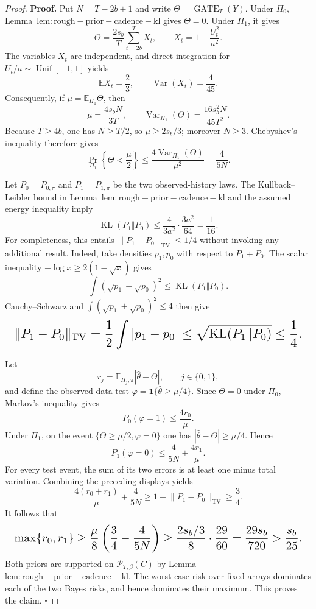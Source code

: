 \documentclass{article}
\begin{document}
\begin{proof}
\textbf{Proof.} Put \(N=T-2b+1\) and write \(\Theta=\operatorname{GATE}_T(Y)\). Under \(\Pi_0\), Lemma~\(\mathrm{lem:rough-prior-cadence-kl}\) gives \(\Theta=0\). Under \(\Pi_1\), it gives
\[
\Theta=\frac{2s_b}{T}\sum_{t=2b}^T X_t,
\qquad
X_t=1-\frac{U_t^2}{a^2}.
\]
The variables \(X_t\) are independent, and direct integration for \(U_t/a\sim\operatorname{Unif}[-1,1]\) yields
\[
\mathbb E X_t=\frac23,
\qquad
\operatorname{Var}(X_t)=\frac4{45}.
\]
Consequently, if \(\mu=\mathbb E_{\Pi_1}\Theta\), then
\[
\mu=\frac{4s_bN}{3T},
\qquad
\operatorname{Var}_{\Pi_1}(\Theta)=\frac{16s_b^2N}{45T^2}.
\]
Because \(T\ge4b\), one has \(N\ge T/2\), so \(\mu\ge2s_b/3\); moreover \(N\ge3\). Chebyshev's inequality therefore gives
\[
\Pr_{\Pi_1}\left\{\Theta<\frac\mu2\right\}
\le \frac{4\operatorname{Var}_{\Pi_1}(\Theta)}{\mu^2}
=\frac4{5N}.
\]

Let \(P_0=P_{0,\pi}\) and \(P_1=P_{1,\pi}\) be the two observed-history laws. The Kullback--Leibler bound in Lemma~\(\mathrm{lem:rough-prior-cadence-kl}\) and the assumed energy inequality imply
\[
\operatorname{KL}(P_1\Vert P_0)
\le \frac{4}{3a^2}\cdot\frac{3a^2}{64}
=\frac1{16}.
\]
For completeness, this entails \(\lVert P_1-P_0\rVert_{\mathrm{TV}}\le1/4\) without invoking any additional result. Indeed, take densities \(p_1,p_0\) with respect to \(P_1+P_0\). The scalar inequality \(-\log x\ge2(1-\sqrt{x})\) gives
\[
\int(\sqrt{p_1}-\sqrt{p_0})^2
\le \operatorname{KL}(P_1\Vert P_0).
\]
Cauchy--Schwarz and \(\int(\sqrt{p_1}+\sqrt{p_0})^2\le4\) then give
\[
\makebox[\linewidth][c]{\resizebox{0.98\linewidth}{!}{\(\displaystyle \lVert P_1-P_0\rVert_{\mathrm{TV}}
=\frac12\int|p_1-p_0|
\le\sqrt{\operatorname{KL}(P_1\Vert P_0)}
\le\frac14.\)}}
\]

Let
\[
r_j=\mathbb E_{\Pi_j,\pi}\left|\widehat\theta-\Theta\right|,
\qquad j\in\{0,1\},
\]
and define the observed-data test \(\varphi=\mathbf1\{\widehat\theta\ge\mu/4\}\). Since \(\Theta=0\) under \(\Pi_0\), Markov's inequality gives
\[
P_0(\varphi=1)\le\frac{4r_0}{\mu}.
\]
Under \(\Pi_1\), on the event \(\{\Theta\ge\mu/2,\varphi=0\}\) one has \(|\widehat\theta-\Theta|\ge\mu/4\). Hence
\[
P_1(\varphi=0)
\le\frac4{5N}+\frac{4r_1}{\mu}.
\]
For every test event, the sum of its two errors is at least one minus total variation. Combining the preceding displays yields
\[
\frac{4(r_0+r_1)}{\mu}+\frac4{5N}
\ge1-\lVert P_1-P_0\rVert_{\mathrm{TV}}
\ge\frac34.
\]
It follows that
\[
\makebox[\linewidth][c]{\resizebox{0.98\linewidth}{!}{\(\displaystyle \max\{r_0,r_1\}
\ge\frac\mu8\left(\frac34-\frac4{5N}\right)
\ge\frac{2s_b/3}{8}\cdot\frac{29}{60}
=\frac{29s_b}{720}
>\frac{s_b}{25}.\)}}
\]
Both priors are supported on \(\mathcal P_{T,\beta}(C)\) by Lemma~\(\mathrm{lem:rough-prior-cadence-kl}\). The worst-case risk over fixed arrays dominates each of the two Bayes risks, and hence dominates their maximum. This proves the claim. \(\square\)
\end{proof}
\end{document}
